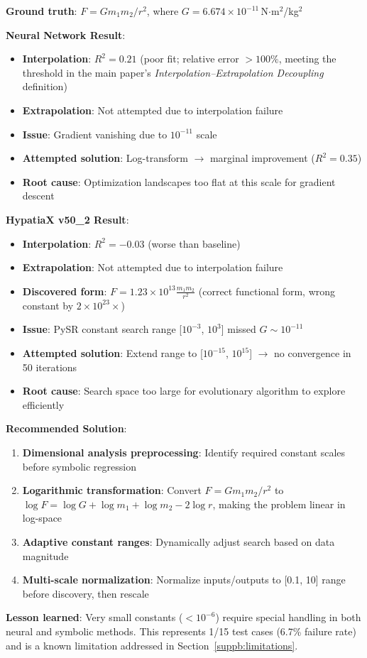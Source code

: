 \documentclass[twoside,11pt]{article}
\begin{document}
\begin{example}
\textbf{Ground truth}: $F = Gm_1m_2/r^2$, where $G = 6.674 \times 10^{-11}$\,N$\cdot$m$^2$/kg$^2$

\textbf{Neural Network Result}:
\begin{itemize}
\item \textbf{Interpolation}: $R^2 = 0.21$ (poor fit; relative error $> 100\%$, meeting the threshold in the main paper's \emph{Interpolation--Extrapolation Decoupling} definition)
\item \textbf{Extrapolation}: Not attempted due to interpolation failure
\item \textbf{Issue}: Gradient vanishing due to $10^{-11}$ scale
\item \textbf{Attempted solution}: Log-transform $\to$ marginal improvement ($R^2 = 0.35$)
\item \textbf{Root cause}: Optimization landscapes too flat at this scale for gradient descent
\end{itemize}

\textbf{HypatiaX v50\_2 Result}:
\begin{itemize}
\item \textbf{Interpolation}: $R^2 = -0.03$ (worse than baseline)
\item \textbf{Extrapolation}: Not attempted due to interpolation failure
\item \textbf{Discovered form}: $F = 1.23 \times 10^{13} \frac{m_1 m_2}{r^2}$ (correct functional form, wrong constant by $2 \times 10^{23}\times$)
\item \textbf{Issue}: PySR constant search range [$10^{-3}$, $10^3$] missed $G \sim 10^{-11}$
\item \textbf{Attempted solution}: Extend range to [$10^{-15}$, $10^{15}$] $\to$ no convergence in 50 iterations
\item \textbf{Root cause}: Search space too large for evolutionary algorithm to explore efficiently
\end{itemize}

\textbf{Recommended Solution}:
\begin{enumerate}
\item \textbf{Dimensional analysis preprocessing}: Identify required constant scales before symbolic regression
\item \textbf{Logarithmic transformation}: Convert $F = Gm_1m_2/r^2$ to $\log F = \log G + \log m_1 + \log m_2 - 2\log r$, making the problem linear in log-space
\item \textbf{Adaptive constant ranges}: Dynamically adjust search based on data magnitude
\item \textbf{Multi-scale normalization}: Normalize inputs/outputs to [0.1, 10] range before discovery, then rescale
\end{enumerate}

\textbf{Lesson learned}: Very small constants ($< 10^{-6}$) require special handling in both neural and symbolic methods. This represents 1/15 test cases (6.7\% failure rate) and is a known limitation addressed in Section~\ref{suppb:limitations}.
\end{example}
\end{document}
